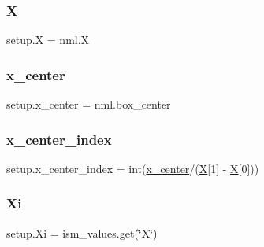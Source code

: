 \subsubsection{\texorpdfstring{X}{X}}
{\footnotesize\ttfamily setup.\+X = nml.\+X}

\mbox{\label{namespacesetup_a995201ad997d1a878ac4993acf76bab4}} 
\subsubsection{\texorpdfstring{x\+\_\+center}{x\_center}}
{\footnotesize\ttfamily setup.\+x\+\_\+center = nml.\+box\+\_\+center}

\mbox{\label{namespacesetup_a9a740cd3a2b0dd50e64afd7b8be31573}} 
\subsubsection{\texorpdfstring{x\+\_\+center\+\_\+index}{x\_center\_index}}
{\footnotesize\ttfamily setup.\+x\+\_\+center\+\_\+index = int(\hyperlink{namespacesetup_a995201ad997d1a878ac4993acf76bab4}{x\+\_\+center}/(\hyperlink{namespacesetup_a0d71901ea06bb31a1b5e9e742158486f}{X}\mbox{[}1\mbox{]} -\/ \hyperlink{namespacesetup_a0d71901ea06bb31a1b5e9e742158486f}{X}\mbox{[}0\mbox{]}))}

\mbox{\label{namespacesetup_a00f06ca1c6c88f3a98172521f2537183}} 
\subsubsection{\texorpdfstring{Xi}{Xi}}
{\footnotesize\ttfamily setup.\+Xi = ism\+\_\+values.\+get(\char`\"{}X\char`\"{})}

